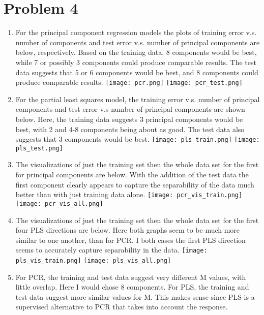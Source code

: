 \section*{Problem 4}
\begin{enumerate}
\item For the principal component regression models the plots of training error v.s. number of components and test error v.s. number of principal components are below, respectively. Based on the training data, 8 components would be best, while 7 or possibly 3 components could produce comparable results. The test data suggests that 5 or 6 components would be best, and 8 components could produce comparable results.  \newline 
\texttt{[image: pcr.png]}
\texttt{[image: pcr\_test.png]}
\item For the partial least squares model, the training error v.s. number of principal components and test error v.s number of principal components are shown below. Here, the training data suggests 3  principal components would be best, with 2 and 4-8 components being about as good. The test data also suggests that 3 components would be best. \newline
\texttt{[image: pls\_train.png]}
\texttt{[image: pls\_test.png]}
\item The visualizations of just the training set then the whole data set for the first for principal components are below. With the addition of the test data the first component clearly appears to capture the separability of the data much better than with just training data alone. \newline
\texttt{[image: pcr\_vis\_train.png]}
\texttt{[image: pcr\_vis\_all.png]}
\item The visualizations of just the training set then the whole data set for the first four PLS directions are below. Here both graphs seem to be much more similar to one another, than for PCR. I both cases the first PLS direction seems to accurately capture separability in the data.  \newline
\texttt{[image: pls\_vis\_train.png]}
\texttt{[image: pls\_vis\_all.png]}
\item For PCR, the training and test data suggest very different M values, with little overlap. Here I would chose 8 components. For PLS, the training and test data suggest more similar values for M. This makes sense since PLS is a supervised alternative to PCR that takes into account the response. 
\end{enumerate}